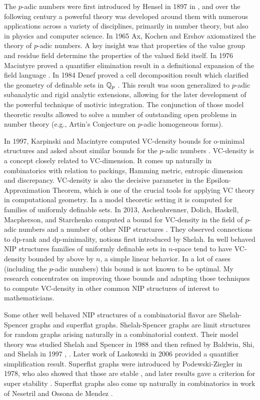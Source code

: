 The $p$-adic numbers were first introduced by Hensel in 1897 in \cite{hensel}, and over the following century a powerful theory was developed around them with numerous applications across a variety of disciplines, primarily in number theory, but also in physics and computer science.
In 1965 Ax, Kochen \cite{ak1} and Ershov \cite{er1} axiomatized the theory of $p$-adic numbers. 
A key insight was that properties of the value group and residue field determine the properties of the valued field itself.
In 1976 Macintyre proved a quantifier elimination result in a definitional expansion of the field language \cite{mac76}.
In 1984 Denef proved a cell decomposition result which clarified the geometry of definable sets in $\mathbb{Q}_p$ \cite{den84}.
This result was soon generalized to $p$-adic subanalytic and rigid analytic extensions, allowing for the later development of the powerful technique of motivic integration.
The conjunction of those model theoretic results allowed to solve a number of outstanding open problems in number theory (e.g., Artin's Conjecture on $p$-adic homogeneous forms).

In 1997, Karpinski and Macintyre computed VC-density bounds for o-minimal structures and asked about similar bounds for the $p$-adic numbers \cite{karp97}.
VC-density is a concept closely related to VC-dimension.
It comes up naturally in combinatorics with relation to packings, Hamming metric, entropic dimension and discrepancy.
 VC-density is also the decisive parameter in the Epsilon-Approximation Theorem, which is one of the crucial tools for applying VC theory in computational geometry.
In a model theoretic setting it is computed for families of uniformly definable sets.
 In 2013, Aschenbrenner, Dolich, Haskell, Macpherson, and Starchenko computed a bound for VC-density in the field of $p$-adic numbers and a number of other NIP structures \cite{density}.
They observed connections to dp-rank and dp-minimality, notions first introduced by Shelah.
In well behaved NIP structures families of uniformly definable sets in $n$-space
tend to have VC-density bounded by above by $n$, a simple linear behavior.
In a lot of cases (including the $p$-adic numbers) this bound is not known to be optimal.
My research concentrates on improving those bounds and adapting those techniques to compute VC-density in other common NIP structures of interest to mathematicians.

Some other well behaved NIP structures of a combinatorial flavor are Shelah-Spencer graphs and superflat graphs.
Shelah-Spencer graphs are limit structures for random graphs arising naturally in a combinatorial context.
Their model theory was studied Shelah and Spencer in 1988 \cite{spencer} and then refined by Baldwin, Shi, and Shelah in 1997 \cite{shi}, \cite{baldwin}.
Later work of Laskowski in 2006 \cite{laskowski} provided a quantifier simplification result.
 Superflat graphs were introduced by Podewski-Ziegler in 1978, who also showed that those are stable \cite{stable_graphs}, and later results gave a criterion for super stability \cite{ultraflat}.
Superflat graphs also come up naturally in combinatorics in work of Nesetril and Ossona de Mendez \cite{nowhere}.

